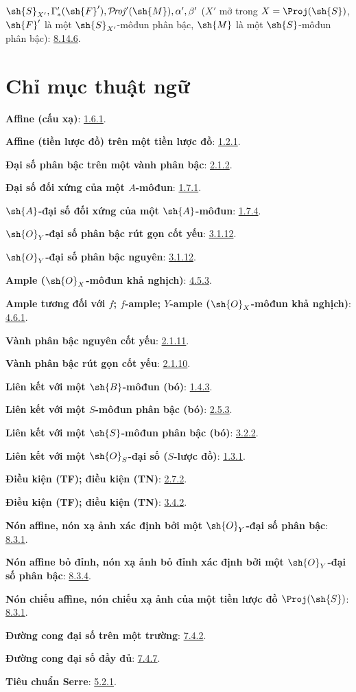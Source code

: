 \documentclass[oneside,10pt]{amsart}
\def\shProj{\mathcal{P}\!\mathit{roj}}
\newcommand{\oldpage}[2][]{\marginnote{\normalfont\footnotesize\textbf{#1}~|~#2}\ignorespaces}
\begin{document}
$\sh{S}_{X'},\Gamma'_*(\sh{F}'),\shProj'(\sh{M}),
\alpha',\beta'$
($X'$ mở trong $X=\Proj(\sh{S})$, $\sh{F}'$ là một $\sh{S}_{X'}$-môđun phân bậc,
$\sh{M}$ là một $\sh{S}$-môđun phân bậc): \hyperref[II.8.14.6]{8.14.6}.

\endgroup

\clearpage
\oldpage[II]{209}
{}
\section*{Chỉ mục thuật ngữ}

\begingroup
\small
\setlength{\parindent}{0pt}
\setlength{\parskip}{2pt}
\newcommand{\egaTerm}[2]{\textbf{#1}: #2.\par}

\egaTerm{Affine (cấu xạ)}{\hyperref[II.1.6.1]{1.6.1}}
\egaTerm{Affine (tiền lược đồ) trên một tiền lược đồ}{\hyperref[II.1.2.1]{1.2.1}}
\egaTerm{Đại số phân bậc trên một vành phân bậc}{\hyperref[II.2.1.2]{2.1.2}}
\egaTerm{Đại số đối xứng của một $A$-môđun}{\hyperref[II.1.7.1]{1.7.1}}
\egaTerm{$\sh{A}$-đại số đối xứng của một $\sh{A}$-môđun}{\hyperref[II.1.7.4]{1.7.4}}
\egaTerm{$\sh{O}_Y$-đại số phân bậc rút gọn cốt yếu}{\hyperref[II.3.1.12]{3.1.12}}
\egaTerm{$\sh{O}_Y$-đại số phân bậc nguyên}{\hyperref[II.3.1.12]{3.1.12}}
\egaTerm{Ample ($\sh{O}_X$-môđun khả nghịch)}{\hyperref[II.4.5.3]{4.5.3}}
\egaTerm{Ample tương đối với $f$; $f$-ample; $Y$-ample ($\sh{O}_X$-môđun khả nghịch)}{\hyperref[II.4.6.1]{4.6.1}}
\egaTerm{Vành phân bậc nguyên cốt yếu}{\hyperref[II.2.1.11]{2.1.11}}
\egaTerm{Vành phân bậc rút gọn cốt yếu}{\hyperref[II.2.1.10]{2.1.10}}
\egaTerm{Liên kết với một $\sh{B}$-môđun (bó)}{\hyperref[II.1.4.3]{1.4.3}}
\egaTerm{Liên kết với một $S$-môđun phân bậc (bó)}{\hyperref[II.2.5.3]{2.5.3}}
\egaTerm{Liên kết với một $\sh{S}$-môđun phân bậc (bó)}{\hyperref[II.3.2.2]{3.2.2}}
\egaTerm{Liên kết với một $\sh{O}_S$-đại số ($S$-lược đồ)}{\hyperref[II.1.3.1]{1.3.1}}

\egaTerm{Điều kiện (TF); điều kiện (TN)}{\hyperref[II.2.7.2]{2.7.2}}
\egaTerm{Điều kiện (TF); điều kiện (TN)}{\hyperref[II.3.4.2]{3.4.2}}
\egaTerm{Nón affine, nón xạ ảnh xác định bởi một $\sh{O}_Y$-đại số phân bậc}{\hyperref[II.8.3.1]{8.3.1}}
\egaTerm{Nón affine bỏ đỉnh, nón xạ ảnh bỏ đỉnh xác định bởi một $\sh{O}_Y$-đại số phân bậc}{\hyperref[II.8.3.4]{8.3.4}}
\egaTerm{Nón chiếu affine, nón chiếu xạ ảnh của một tiền lược đồ $\Proj(\sh{S})$}{\hyperref[II.8.3.1]{8.3.1}}
\egaTerm{Đường cong đại số trên một trường}{\hyperref[II.7.4.2]{7.4.2}}
\egaTerm{Đường cong đại số đầy đủ}{\hyperref[II.7.4.7]{7.4.7}}
\egaTerm{Tiêu chuẩn Serre}{\hyperref[II.5.2.1]{5.2.1}}
\end{document}
